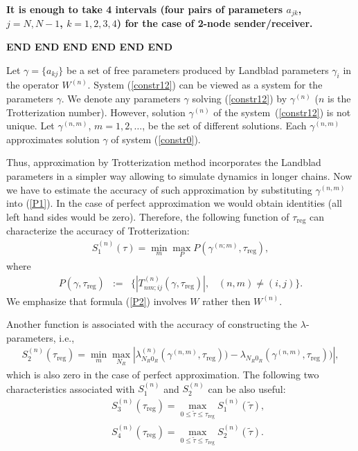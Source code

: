 \documentclass[pra,preprint,showpacs]{revtex4-1}
\begin{document}
{{\bf It is enough to take 4 intervals (four pairs of parameters $a_{jk}$, $j=N,N-1$, $k=1,2,3,4$) for the case of 2-node sender/receiver.}

\iffalse
{\bf END   END  END  END  END  END}

Let $\gamma= \{a_{kj}\}$ be a set of free parameters produced by Landblad parameters $\gamma_i$  in the operator $W^{(n)}$. System (\ref{constr12}) can be viewed as a system for the parameters $\gamma$. We denote any parameters $\gamma$  solving  (\ref{constr12}) by $\gamma^{(n)}$ ($n$ is the Trotterization number).
However,  solution $\gamma^{(n)}$ of the system~(\ref{constr12}) is not unique.
Let $\gamma^{(n,m)}$, $m=1,2,\dots$,  be the set of different solutions.
Each  $\gamma^{(n,m)}$ approximates solution $\gamma$ of system
(\ref{constr0}).

Thus, approximation by Trotterization method incorporates the Landblad parameters in a simpler way allowing to simulate dynamics in longer chains. Now we have to estimate the accuracy of such approximation by substituting $\gamma^{(n,m)}$ into (\ref{P1}). In the case of perfect approximation we would obtain identities (all left hand sides would be zero). Therefore, the following function { of $\tau_{\mathrm{reg}}$} can characterize the accuracy of Trotterization:
\begin{eqnarray}\label{epsilon}
S^{(n)}_1(\tau) =\min_m \max_P P(\gamma^{(n;m)},\tau_{\mathrm{reg}}),
\end{eqnarray}
where
\begin{eqnarray}\label{P2}
 P(\gamma,\tau_{\mathrm{reg}})&:=&\Big\{|T^{(n)}_{nm;ij}(\gamma,\tau_{\mathrm{reg}})|, \;\;\;(n,m)\neq (i,j)\Big\}.
\end{eqnarray}
We emphasize that formula (\ref{P2}) involves $W$ rather then $W^{(n)}$.

Another function is associated with the accuracy of constructing the $\lambda$-parameters, i.e.,
\begin{eqnarray}\label{epsilon2}
S^{(n)}_2(\tau_{\mathrm{reg}}) =\min_m\max_{N_R} \left|\lambda^{(n)}_{N_R0_R}(\gamma^{(n,m)},\tau_{\mathrm{reg}})) -
\lambda_{N_R0_R}(\gamma^{(n,m)},\tau_{\mathrm{reg}}))\right|,
\end{eqnarray}
which is also zero in the case of perfect approximation.
The following two characteristics associated with $S_1^{(n)}$ and $S_2^{(n)}$ can be also useful:
\begin{eqnarray}\label{S3}
&&
S^{(n)}_3(\tau_{\mathrm{reg}}) = \max_{0\le\tilde \tau\le \tau_{\mathrm{reg}}} S^{(n)}_1(\tilde \tau),
\\\label{S4}
&&
S^{(n)}_4(\tau_{\mathrm{reg}}) = \max_{0\le\tilde \tau\le \tau_{\mathrm{reg}}} S^{(n)}_2(\tilde \tau).
\end{eqnarray}

}
\end{document}
